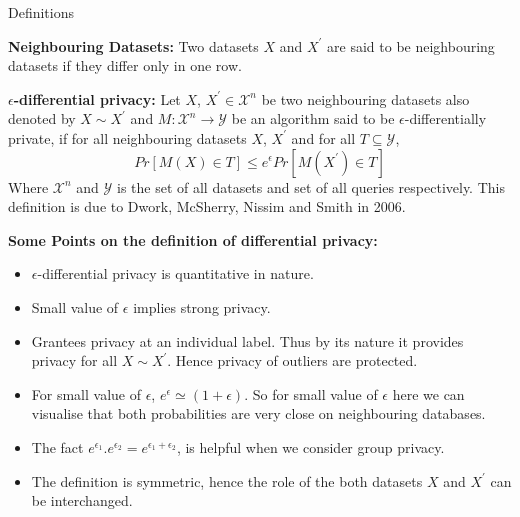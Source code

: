 \documentclass[aspectratio=169]{beamer}
\begin{document}
\begin{frame}{Definitions}
\begin{definition}
\textbf{Neighbouring Datasets: }Two datasets $X$ and $X^\prime$ are said to be neighbouring datasets if they differ only in one row.
\end{definition}
\pause
\begin{definition}
\textbf{$\epsilon$-differential privacy: }Let $X$, $X^\prime \in \mathscr{X}^n$ be two neighbouring datasets also denoted by $X \sim X^\prime$ and $M:\mathscr{X}^n \rightarrow \mathscr{Y}$ be an algorithm said to be $\epsilon$-differentially private, if for all neighbouring  datasets $X$, $X^\prime$ and for all $T \subseteq \mathscr{Y}$,
$$Pr[M(X) \in T] \leq e^\epsilon Pr[M(X^\prime) \in T]$$
Where $\mathscr{X}^n$ and $\mathscr{Y}$ is the set of all datasets and set of all queries respectively. This definition is due to Dwork, McSherry, Nissim and Smith in 2006.
\end{definition}

\end{frame}

\begin{frame}
\textbf{Some Points on the definition of differential privacy: }
\begin{itemize}
\item
$\epsilon$-differential privacy is quantitative in nature. \pause
\item
Small value of $\epsilon$ implies strong privacy. \pause
\item
Grantees privacy at an individual label. Thus by its nature it provides privacy for all $X \sim X^\prime$. Hence privacy of outliers are protected. \pause
\item
For small value of $\epsilon$, $e^\epsilon \simeq (1+\epsilon)$. So for small value of $\epsilon$ here we can visualise that both probabilities are very close on neighbouring databases. \pause
\item
The fact $e^{\epsilon_1} . e^{\epsilon_2}=e^{\epsilon_1 + \epsilon_2}$, is helpful when we consider group privacy. \pause
\item
The definition is symmetric, hence the role of the both datasets $X$ and $X^\prime$ can be interchanged. \pause
\end{itemize}
\end{frame}
\end{document}
